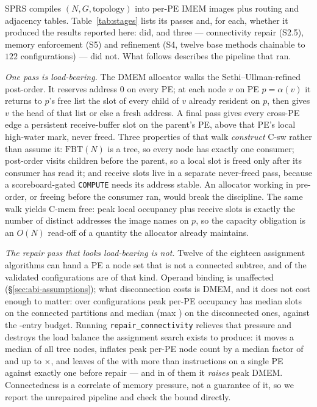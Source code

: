 \documentclass[journal,10pt]{IEEEtran}
\theoremstyle{plain}
\theoremstyle{definition}
\theoremstyle{remark}
\newcommand{\FBT}{\ensuremath{\mathrm{FBT}}}
\newcommand{\sprs}{\textsc{SPRS}}
\newcommand{\sv}[1]{\texttt{#1}}
\newcommand{\asgn}{\ensuremath{\alpha}}
\begin{document}
\sprs{} compiles $(N, G, \text{topology})$ into per-PE IMEM images plus
routing and adjacency tables. Table~\ref{tab:stages} lists its passes and,
for each, whether it produced the results reported here: \StagesRun{} did, and
three --- connectivity repair (S2.5), memory enforcement (S5) and refinement
(S4, twelve base methods chainable to $122$ configurations) --- did not. What
follows describes the pipeline that ran.

\emph{One pass is load-bearing.} The DMEM allocator walks the
Sethi--Ullman-refined post-order. It reserves address $0$ on every PE; at each
node $v$ on PE $p=\asgn(v)$ it returns to $p$'s free list the slot of every
child of $v$ already resident on $p$, then gives $v$ the head of that list or
else a fresh address. A final pass gives every cross-PE edge a persistent
receive-buffer slot on the parent's PE, above that PE's local high-water mark,
never freed. Three properties of that walk \emph{construct} \textsf{C-sw}
rather than assume it: $\FBT(N)$ is a tree, so every node has exactly one
consumer; post-order visits children before the parent, so a local slot is
freed only after its consumer has read it; and receive slots live in a
separate never-freed pass, because a scoreboard-gated \texttt{COMPUTE} needs
its address stable. An allocator working in pre-order, or freeing before the
consumer ran, would break the discipline. The same walk yields \textsf{C-mem}
free: peak local occupancy plus receive slots is exactly the number of
distinct addresses the image names on $p$, so the capacity obligation is an
$O(N)$ read-off of a quantity the allocator already maintains.

\emph{The repair pass that looks load-bearing is not.} Twelve of the
eighteen assignment algorithms can hand a PE a node set that is not a connected
subtree, and \DisconnCount{} of the \WallTBs{} validated configurations are of
that kind. Operand binding is unaffected (\S\ref{sec:abi-assumptions}); what
disconnection costs is DMEM, and it does not cost enough to matter: over
\BindConfigs{} configurations peak per-PE occupancy has median \DmemMedConn{}
slots on the \DmemConnConfigs{} connected partitions and median \DmemMedDisc{}
(max \DmemPeakMax) on the \DmemDiscConfigs{} disconnected ones, against the
\DmemDepth-entry budget. Running \sv{repair\_connectivity} relieves that
pressure and destroys the load balance the assignment search exists to produce:
it moves a median \RepairMovedMed{} of all tree nodes, inflates peak per-PE
node count by a median factor of \RepairLoadMed{} and up to
\RepairLoadMax$\times$, and leaves \RepairImemOver{} of the
\DmemDiscConfigs{} with more than \DmemDepth{} instructions on a single PE
against exactly one before repair --- and in \RepairDmemUp{} of them it
\emph{raises} peak DMEM. Connectedness is a correlate of memory pressure, not a
guarantee of it, so we report the unrepaired pipeline and check the bound
directly.
\end{document}
